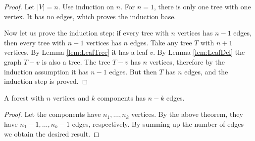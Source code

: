 \begin{page}
\setcounter{section}{2}
\setcounter{subsection}{3}
\setcounter{dfn}{7}
\label{portion:231}

\begin{proof}
Let $|V| = n$.
Use induction on $n$.
For $n=1$, there is only one tree with one vertex.
It has no edges, which proves the induction base.

Now let us prove the induction step: if every tree with $n$ vertices has $n-1$ edges, then every tree with $n+1$ vertices has $n$ edges.
Take any tree $T$ with $n+1$ vertices.
By Lemma \ref{lem:LeafTree} it has a leaf $v$.
By Lemma \ref{lem:LeafDel} the graph $T - v$ is also a tree.
The tree $T - v$ has $n$ vertices, therefore by the induction assumption it has $n-1$ edges.
But then $T$ has $n$ edges, and the induction step is proved.
\end{proof}


\end{page}

\begin{page}
\setcounter{section}{2}
\setcounter{subsection}{3}
\setcounter{dfn}{8}
\label{portion:233}

\begin{cor}
\label{cor:ForestEdges}
A forest with $n$ vertices and $k$ components has $n-k$ edges.
\end{cor}

\end{page}

\begin{page}
\setcounter{section}{2}
\setcounter{subsection}{3}
\setcounter{dfn}{8}
\label{portion:234}

\begin{proof}
Let the components have $n_1, \ldots, n_k$ vertices.
By the above theorem, they have $n_1 - 1, \ldots, n_k - 1$ edges, respectively.
By summing up the number of edges we obtain the desired result.
\end{proof}

% 

\end{page}

\begin{page}
\setcounter{section}{2}
\setcounter{subsection}{3}
\setcounter{dfn}{9}
\label{portion:236}


\end{page}

